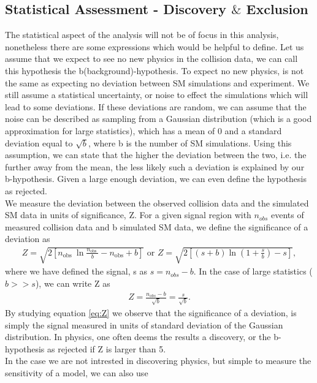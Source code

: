 \subsection{Statistical Assessment - Discovery $\&$ Exclusion}\label{subsec:Sensitivity}
The statistical aspect of the analysis will not be of focus in this analysis, nonetheless there are 
some expressions which would be helpful to define. Let us assume that we expect to see no new physics in the collision
data, we can call this hypothesis the b(background)-hypothesis. To expect no new physics, is not the same as expecting no 
deviation between \ac{SM} simulations and experiment. We still assume a statistical uncertainty, or noise to effect the simulations which 
will lead to some deviations. If these deviations are random, we can assume that the noise can be described as sampling from a Gaussian distribution 
(which is a good approximation for large statistics), which has a mean of 0 and a standard deviation equal to $\sqrt{b}$, where b is 
the number of \ac{SM} simulations. Using this assumption, we can state that the higher the deviation between the two, i.e. the further away 
from the mean, the less likely such a deviation is explained by our b-hypothesis. Given a large enough deviation, we can even 
define the hypothesis as rejected.
\\
We measure the deviation between the observed collision data and the simulated \ac{SM} data in units of significance, Z. 
For a given signal region with $n_{obs}$ events of measured collision data and b simulated \ac{SM} data, we define
the significance of a deviation as
\begin{align}
Z=\sqrt{2\left[n_{\text {obs }} \ln \frac{n_{\text {obs }}}{b}-n_{\mathrm{obs}}+b\right]} \text { or } 
Z=\sqrt{2\left[(s+b) \ln \left(1+\frac{s}{b}\right)-s\right]}, 
\end{align}
where we have defined the signal, s as $s = n_{obs} - b$. In the case of large statistics ($b>>s$), we can write Z 
as 
\begin{align}\label{eq:Z}
    Z=\frac{n_{o b s}-b}{\sqrt{b}} = \frac{s}{\sqrt{b}}.
\end{align}
By studying equation \ref{eq:Z} we observe that the significance of a deviation, is simply the signal measured in units of standard
deviation of the Gaussian distribution. In physics, one often deems the results a discovery, or the b-hypothesis as rejected if Z is 
larger than 5. 
\\
In the case we are not intrested in discovering physics, but simple to measure the sensitivity of a model, we can also use 
